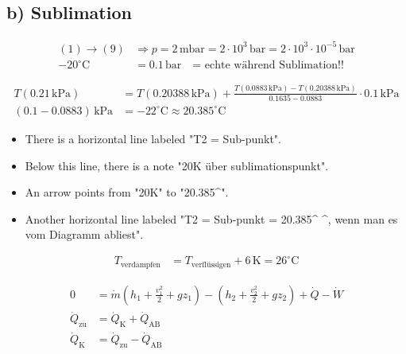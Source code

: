 \subsection*{b) Sublimation}

\begin{align*}
    (1) \rightarrow (9) & \Rightarrow p = 2 \, \text{mbar} = 2 \cdot 10^3 \, \text{bar} = 2 \cdot 10^3 \cdot 10^{-5} \, \text{bar} \\
    -20^\circ \text{C} & = 0.1 \, \text{bar} \quad \text{= echte während Sublimation!!}
\end{align*}

\begin{align*}
    T(0.21 \, \text{kPa}) & = T(0.20388 \, \text{kPa}) + \frac{T(0.0883 \, \text{kPa}) - T(0.20388 \, \text{kPa})}{0.1635 - 0.0883} \cdot 0.1 \, \text{kPa} \\
    (0.1 - 0.0883) \, \text{kPa} & = -22^\circ \text{C} \approx 20.385^\circ \text{C}
\end{align*}

\begin{itemize}
    \item There is a horizontal line labeled "T2 = Sub-punkt".
    \item Below this line, there is a note "20K über sublimationspunkt".
    \item An arrow points from "20K" to "20.385^\circ {}".
    \item Another horizontal line labeled "T2 = Sub-punkt = 20.385^\circ {} ^\circ {}, wenn man es vom Diagramm abliest".
\end{itemize}

\begin{align*}
    T_{\text{verdampfen}} & = T_{\text{verflüssigen}} + 6 \, \text{K} = 26^\circ \text{C}
\end{align*}

\begin{align*}
    0 & = \dot{m} \left( h_1 + \frac{v_1^2}{2} + g z_1 \right) - \left( h_2 + \frac{v_2^2}{2} + g z_2 \right) + \dot{Q} - \dot{W} \\
    \dot{Q}_{\text{zu}} & = \dot{Q}_{\text{K}} + \dot{Q}_{\text{AB}} \\
    \dot{Q}_{\text{K}} & = \dot{Q}_{\text{zu}} - \dot{Q}_{\text{AB}}
\end{align*}

